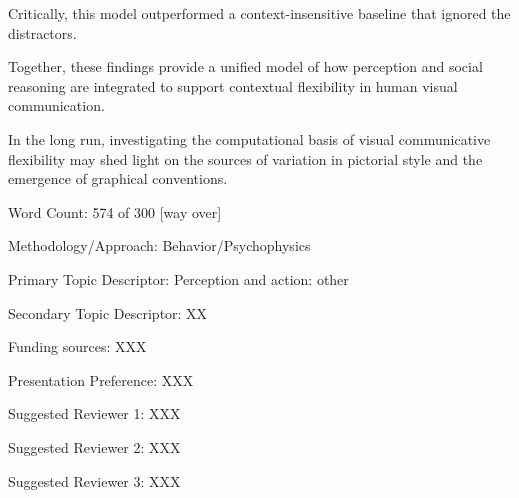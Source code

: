 \documentclass{article}
\begin{document}
Critically, this model outperformed a context-insensitive baseline that ignored the distractors. 

Together, these findings provide a unified model of how perception and social reasoning are integrated to support contextual flexibility in human visual communication. 

In the long run, investigating the computational basis of visual communicative flexibility may shed light on the sources of variation in pictorial style and the emergence of graphical conventions.


\vspace{3mm}

\begin{description}  
\item Word Count: 574 of 300 [way over]
\item Methodology/Approach: Behavior/Psychophysics
\item Primary Topic Descriptor: Perception and action: other
\item Secondary Topic Descriptor: XX
\item Funding sources: XXX
\item Presentation Preference: XXX
\item Suggested Reviewer 1: XXX
\item Suggested Reviewer 2: XXX
\item Suggested Reviewer 3: XXX
\end{description}
\end{document}
